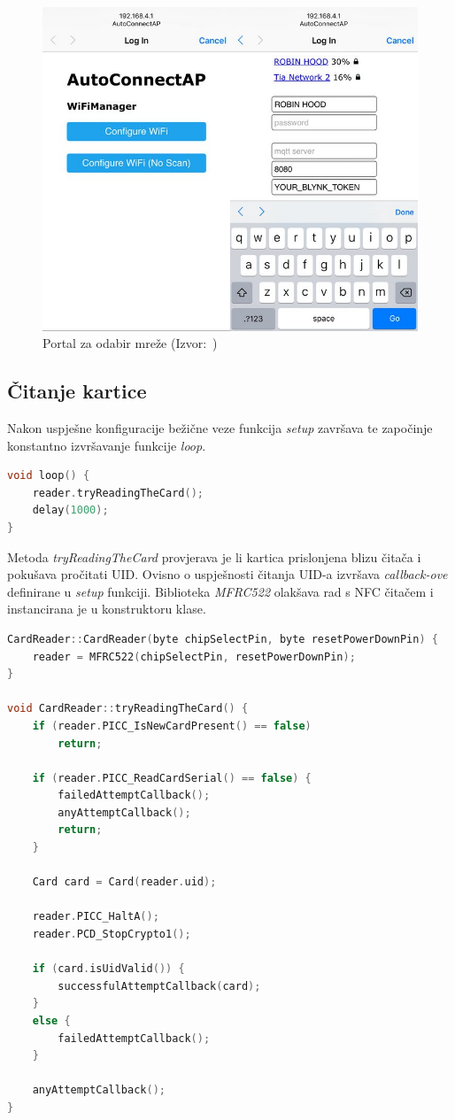 \begin{figure}[h!]
    \centering
    \includegraphics[scale=0.3]{images/wifi-access-point}
    \caption{Portal za odabir mreže (Izvor:~\cite{wifi-manager})}
\end{figure}


\subsection{Čitanje kartice}

Nakon uspješne konfiguracije bežične veze funkcija \textit{setup} završava te započinje konstantno izvršavanje funkcije
\textit{loop}.

\begin{lstlisting}[language=C++]
void loop() {
    reader.tryReadingTheCard();
    delay(1000);
}
\end{lstlisting}

Metoda \textit{tryReadingTheCard} provjerava je li kartica prislonjena blizu čitača i pokušava pročitati UID\@.
Ovisno o uspješnosti čitanja UID-a izvršava \textit{callback-ove} definirane u \textit{setup} funkciji.
Biblioteka \textit{MFRC522} olakšava rad s NFC čitačem i instancirana je u konstruktoru klase.

\begin{lstlisting}[language=C++]
CardReader::CardReader(byte chipSelectPin, byte resetPowerDownPin) {
    reader = MFRC522(chipSelectPin, resetPowerDownPin);
}

void CardReader::tryReadingTheCard() {
    if (reader.PICC_IsNewCardPresent() == false)
        return;

    if (reader.PICC_ReadCardSerial() == false) {
        failedAttemptCallback();
        anyAttemptCallback();
        return;
    }

    Card card = Card(reader.uid);

    reader.PICC_HaltA();
    reader.PCD_StopCrypto1();

    if (card.isUidValid()) {
        successfulAttemptCallback(card);
    }
    else {
        failedAttemptCallback();
    }

    anyAttemptCallback();
}
\end{lstlisting}

